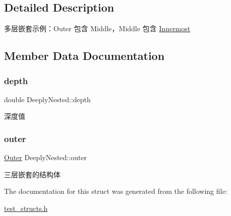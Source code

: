 \subsection{Detailed Description}
多层嵌套示例：\+Outer 包含 Middle，\+Middle 包含 \hyperlink{structInnermost}{Innermost} 

\subsection{Member Data Documentation}
\mbox{\label{structDeeplyNested_a489d8c12c4324e83350fda6374e20b37}} 
\subsubsection{\texorpdfstring{depth}{depth}}
{\footnotesize\ttfamily double Deeply\+Nested\+::depth}



深度值 

\mbox{\label{structDeeplyNested_aabba10c5eb09773cf0930a4f6794476a}} 
\subsubsection{\texorpdfstring{outer}{outer}}
{\footnotesize\ttfamily \hyperlink{structOuter}{Outer} Deeply\+Nested\+::outer}



三层嵌套的结构体 



The documentation for this struct was generated from the following file\+:\begin{DoxyCompactItemize}
\item 
\hyperlink{test__structs_8h}{test\+\_\+structs.\+h}\end{DoxyCompactItemize}
